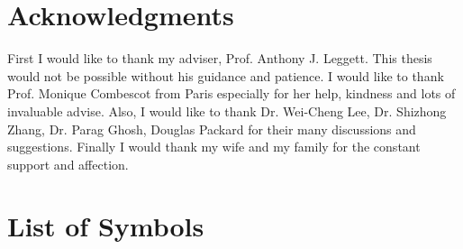 \documentclass[edeposit,fullpage,prequest]{uiucthesis2009}
\begin{document}
\chapter*{Acknowledgments}
First I would like to thank my adviser, Prof. Anthony J. Leggett.  This thesis would not be possible without his guidance and patience.  I would like to thank Prof. Monique Combescot from Paris especially for her help, kindness and lots of invaluable advise.  Also, I would like to thank Dr. Wei-Cheng Lee, Dr. Shizhong Zhang, Dr. Parag Ghosh,  Douglas
Packard  for their many discussions and suggestions.  Finally I would thank my wife and my family for the constant support and affection.  


\tableofcontents

%

\chapter{List of Symbols}
\end{document}
